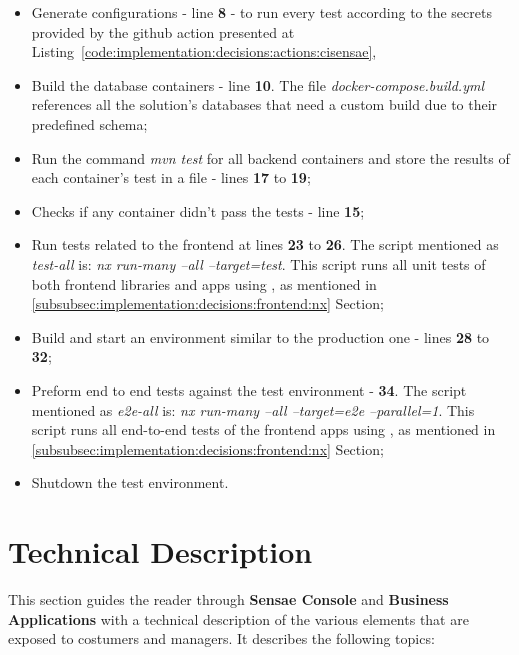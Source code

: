 \begin{itemize}
    \item Generate configurations - line \textbf{8} - to run every test according to the secrets provided by the github action presented at Listing~\ref{code:implementation:decisions:actions:cisensae},
    \item Build the database containers - line \textbf{10}. The file \textit{docker-compose.build.yml} references all the solution's databases that need a custom build due to their predefined schema;
    \item Run the command \textit{mvn test} for all backend containers and store the results of each container's test in a file - lines \textbf{17} to \textbf{19};
    \item Checks if any container didn't pass the tests - line \textbf{15};
    \item Run tests related to the frontend at lines \textbf{23} to \textbf{26}. The script mentioned as \textit{test-all} is: \textit{nx run-many --all --target=test}. This script runs all unit tests of both frontend libraries and apps using , as mentioned in \ref{subsubsec:implementation:decisions:frontend:nx} Section;
    \item Build and start an environment similar to the production one - lines \textbf{28} to \textbf{32};
    \item Preform end to end tests against the test environment - \textbf{34}. The script mentioned as \textit{e2e-all} is: \textit{nx run-many --all --target=e2e --parallel=1}. This script runs all end-to-end tests of the frontend apps using , as mentioned in \ref{subsubsec:implementation:decisions:frontend:nx} Section;
    \item Shutdown the test environment.
\end{itemize}

\section{Technical Description}
\label{sec:implementation:description}

This section guides the reader through \textbf{Sensae Console} and \textbf{Business Applications} with a technical description of the various elements that are exposed to costumers and managers.
It describes the following topics:

